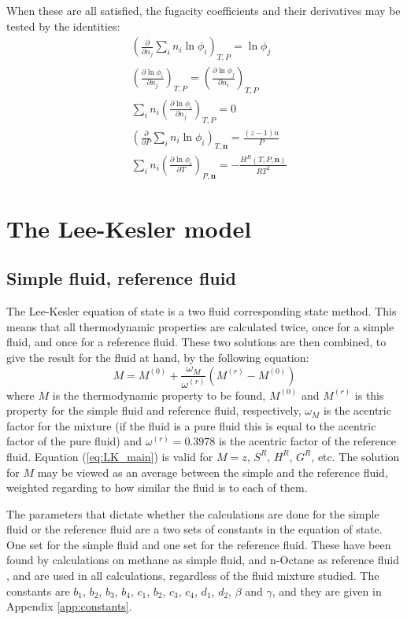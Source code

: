 \documentclass[english]{../thermomemo/thermomemo}
\numberwithin{equation}{section}
\newcommand*{\pder}[2]{\left(\frac{\partial #1}{\partial #2}\right)}
\newcommand*{\reff}[1]{(\ref{#1})}
\begin{document}
When these are all satisfied, the fugacity coefficients and their derivatives may be tested by the identities:
\begin{align}
\label{test:4}
& \left( \frac{\partial}{\partial n_j} \sum_i n_i \ln \phi_i \right)_{T,P} = \ln \phi_j \\
\label{test:5}
& \pder{\ln \phi_i}{n_j}_{T,P} = \pder{\ln \phi_j}{n_i}_{T,P} \\
\label{test:6}
& \sum_i n_i \pder{\ln \phi_i}{n_j}_{T,P} = 0 \\
\label{test:7}
& \left( \frac{\partial}{\partial P} \sum_i n_i \ln \phi_i \right)_{T,\textbf{n}} = \frac{(z-1) n}{P} \\
\label{test:8}
& \sum_i n_i \pder{ \ln \phi_i}{T}_{P,\textbf{n}} = -\frac{H^R(T,P,\textbf{n})}{RT^2}
\end{align}

\section{The Lee-Kesler model}
\subsection{Simple fluid, reference fluid}
\label{sec:simpRef}
The Lee-Kesler equation of state is a two fluid corresponding state method. This means that all thermodynamic properties are calculated twice, once for a simple fluid, and once for a reference fluid. These two solutions are then combined, to give the result for the fluid at hand, by the following equation:
\begin{equation}
\label{eq:LK_main}
M = M^{(0)} + \frac{\omega_M}{\omega^{(r)}}(M^{(r)} - M^{(0)})
\end{equation}
where $M$ is the thermodynamic property to be found, $M^{(0)}$ and $M^{(r)}$ is this property for the simple fluid and reference fluid, respectively, $\omega_M$ is the acentric factor for the mixture (if the fluid is a pure fluid this is equal to the acentric factor of the pure fluid) and $\omega^{(r)} = 0.3978$ is the acentric factor of the reference fluid. Equation \reff{eq:LK_main} is valid for $M = z$, $S^R$, $H^R$, $G^R$, etc. The solution for $M$ may be viewed as an average between the simple and the reference fluid, weighted regarding to how similar the fluid is to each of them.

The parameters that dictate whether the calculations are done for the simple fluid or the reference fluid are a two sets of constants in the equation of state. One set for the simple fluid and one set for the reference fluid. These have been found by calculations on methane as simple fluid, and n-Octane as reference fluid \cite{LK}, and are used in all calculations, regardless of the fluid mixture studied. The constants are $b_1$, $b_2$, $b_3$, $b_4$, $c_1$, $b_2$, $c_3$, $c_4$, $d_1$, $d_2$, $\beta$ and $\gamma$, and they are given in Appendix \ref{app:constants}.
\end{document}
